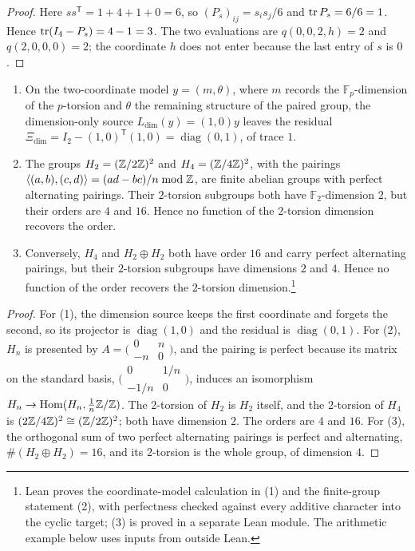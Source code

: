 \begin{proof}
Here $ss^{\mathsf T}=1+4+1+0=6$, so $(P_s)_{ij}=s_is_j/6$ and
$\operatorname{tr} P_s=6/6=1$.  Hence $\operatorname{tr}(I_4-P_s)=4-1=3$.  The two evaluations are
$q(0,0,2,h)=2$ and $q(2,0,0,0)=2$; the coordinate $h$ does not enter
because the last entry of $s$ is $0$.
\end{proof}

\begin{theorem}\label{thm:apparatus:dim-sha-shadow}
\leavevmode
\begin{enumerate}
\item On the two-coordinate model $y=(m,\theta)$, where $m$ records the
  $\mathbb F_p$-dimension of the $p$-torsion and $\theta$ the remaining
  structure of the paired group, the dimension-only source
  $L_{\dim}(y)=(1,0)y$ leaves the residual
  $\Xi_{\dim}=I_2-(1,0)^{\mathsf T}(1,0)=\operatorname{diag}(0,1)$, of
  trace $1$.
\item The groups $H_2=(\mathbb{Z}/2\mathbb{Z})^2$ and $H_4=(\mathbb{Z}/4\mathbb{Z})^2$, with the pairings
  $\langle(a,b),(c,d)\rangle=(ad-bc)/n\bmod\mathbb{Z}$, are finite abelian groups
  with perfect alternating pairings.  Their $2$-torsion subgroups both
  have $\mathbb F_2$-dimension $2$, but their orders are $4$ and $16$.
  Hence no function of the $2$-torsion dimension recovers the order.
\item Conversely, $H_4$ and $H_2\oplus H_2$ both have order $16$ and
  carry perfect alternating pairings, but their $2$-torsion subgroups
  have dimensions $2$ and $4$.  Hence no function of the order recovers
  the $2$-torsion dimension.\footnote{Lean proves the coordinate-model calculation in (1) and the
finite-group statement (2), with perfectness checked against every
additive character into the cyclic target; (3) is proved in a separate
Lean module.  The arithmetic example below uses inputs from outside
Lean.}
\end{enumerate}
\end{theorem}

\begin{proof}
For (1), the dimension source keeps the first coordinate and forgets the
second, so its projector is $\operatorname{diag}(1,0)$ and the residual is
$\operatorname{diag}(0,1)$.  For (2), $H_n$ is presented by
$A=\bigl(\begin{smallmatrix}0&n\\-n&0\end{smallmatrix}\bigr)$, and the
pairing is perfect because its matrix on the standard basis,
$\bigl(\begin{smallmatrix}0&1/n\\-1/n&0\end{smallmatrix}\bigr)$, induces
an isomorphism $H_n\to\operatorname{Hom}(H_n,\frac1n\mathbb{Z}/\mathbb{Z})$.  The
$2$-torsion of $H_2$ is $H_2$ itself, and the $2$-torsion of $H_4$ is
$(2\mathbb{Z}/4\mathbb{Z})^2\cong(\mathbb{Z}/2\mathbb{Z})^2$; both have dimension $2$.  The orders are
$4$ and $16$.  For (3), the orthogonal sum of two perfect alternating
pairings is perfect and alternating, $\#(H_2\oplus H_2)=16$, and its
$2$-torsion is the whole group, of dimension $4$.
\end{proof}

